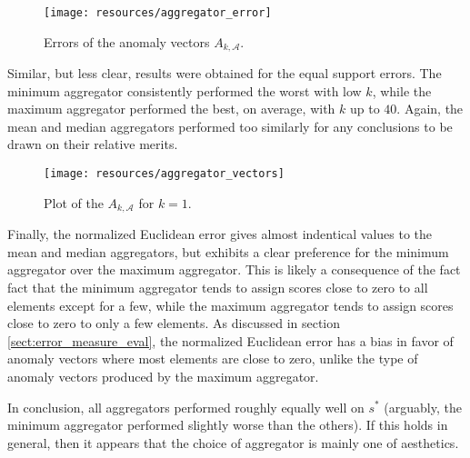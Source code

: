 \begin{figure}[!ht]
    \vspace{-5pt}
    \begin{center}
        \texttt{[image: resources/aggregator\_error]}
    \end{center}
    \vspace{-18pt}
    \caption{\small{Errors of the anomaly vectors $A_{k, \mathcal{A}}$.}}
    \label{fig:aggregator_error}
    \vspace{-10pt}
\end{figure}

Similar, but less clear, results were obtained for the equal support errors. The minimum aggregator consistently performed the worst with low $k$, while the maximum aggregator performed the best, on average, with $k$ up to $40$. Again, the mean and median aggregators performed too similarly for any conclusions to be drawn on their relative merits.

\begin{wrapfigure}{r}{0.49\textwidth}
    \vspace{-20pt}
    \begin{center}
        \texttt{[image: resources/aggregator\_vectors]}
    \end{center}
    \vspace{-20pt}
    \caption{\small{Plot of the $A_{k, \mathcal{A}}$ for $k=1$.}}
    \vspace{-0pt}
    \label{fig:aggregator_vectors}
\end{wrapfigure}

Finally, the normalized Euclidean error gives almost indentical values to the mean and median aggregators, but exhibits a clear preference for the minimum aggregator over the maximum aggregator. This is likely a consequence of the fact fact that the minimum aggregator tends to assign scores close to zero to all elements except for a few, while the maximum aggregator tends to assign scores close to zero to only a few elements. As discussed in section \ref{sect:error_measure_eval}, the normalized Euclidean error has a bias in favor of anomaly vectors where most elements are close to zero, unlike the type of anomaly vectors produced by the maximum aggregator. 

In conclusion, all aggregators performed roughly equally well on $s^*$ (arguably, the minimum aggregator performed slightly worse than the others). If this holds in general, then it appears that the choice of aggregator is mainly one of aesthetics.
